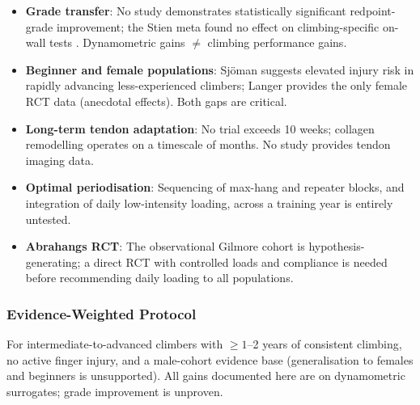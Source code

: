 \begin{itemize}[noitemsep, topsep=2pt]
  \item \textbf{Grade transfer}: No study demonstrates statistically significant redpoint-grade improvement; the Stien meta found no effect on climbing-specific on-wall tests \cite{SO23}. Dynamometric gains $\neq$ climbing performance gains.
  \item \textbf{Beginner and female populations}: Sjöman \cite{O23} suggests elevated injury risk in rapidly advancing less-experienced climbers; Langer \cite{LAS24} provides the only female RCT data (anecdotal effects). Both gaps are critical.
  \item \textbf{Long-term tendon adaptation}: No trial exceeds 10 weeks; collagen remodelling operates on a timescale of months. No study provides tendon imaging data.
  \item \textbf{Optimal periodisation}: Sequencing of max-hang and repeater blocks, and integration of daily low-intensity loading, across a training year is entirely untested.
  \item \textbf{Abrahangs RCT}: The observational Gilmore cohort \cite{GKAO24} is hypothesis-generating; a direct RCT with controlled loads and compliance is needed before recommending daily loading to all populations.
\end{itemize}

\subsubsection{Evidence-Weighted Protocol}

For intermediate-to-advanced climbers with $\geq1$--2 years of consistent climbing, no active finger injury, and a male-cohort evidence base (generalisation to females and beginners is unsupported). All gains documented here are on dynamometric surrogates; grade improvement is unproven.

